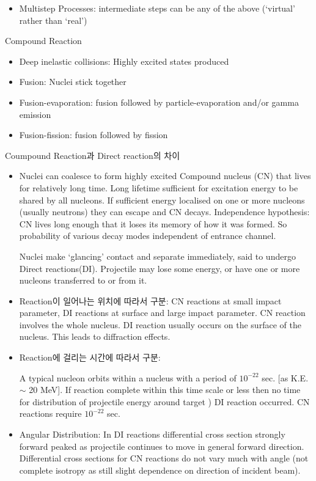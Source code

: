 \documentclass[11pt]{book}
\begin{document}
\begin{itemize}
\item Multistep Processes:
intermediate steps can be any of the above
(`virtual' rather than `real')
\end{itemize}


Compound Reaction
\begin{itemize}
\item Deep inelastic collisions:
Highly excited states produced
\item Fusion:
Nuclei stick together
\item Fusion-evaporation:
fusion followed by particle-evaporation and/or gamma
emission
\item Fusion-fission:
fusion followed by fission

\end{itemize}

Coumpound Reaction과 Direct reaction의 차이
\begin{itemize} 
\item 
Nuclei can coalesce to form highly excited Compound
nucleus (CN) that lives for relatively long time.
Long lifetime sufficient for excitation energy to be shared by
all nucleons. If sufficient energy localised on one or more
nucleons (usually neutrons) they can escape and CN decays.
Independence hypothesis: CN lives long enough that it loses
its memory of how it was formed. So probability of various
decay modes independent of entrance channel.

Nuclei make `glancing' contact and separate immediately, said
to undergo Direct reactions(DI).
Projectile may lose some energy, or have one or more nucleons
transferred to or from it.

\item Reaction이 일어나는 위치에 따라서 구분:
CN reactions at small impact parameter,
DI reactions at surface and large impact parameter.
CN reaction involves the whole nucleus.
DI reaction usually occurs on the surface of the nucleus. This leads
to diffraction effects.

\item Reaction에 걸리는 시간에 따라서 구분:

A typical nucleon orbits within a nucleus with a period of $10^{-22}$
sec. [as K.E. $\sim$ 20 MeV].
If reaction complete within this time scale or less then no time for
distribution of projectile energy around target ) DI reaction
occurred. CN reactions require $10^{-22}$ sec.

\item Angular Distribution:
In DI reactions differential cross section strongly forward peaked as
projectile continues to move in general forward direction.
Differential cross sections for CN reactions do not vary much with
angle (not complete isotropy as still slight dependence on direction
of incident beam).

\end{itemize}
\end{document}

